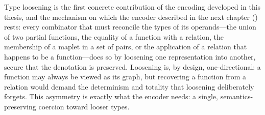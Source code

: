 Type loosening is the first concrete contribution of the encoding developed in this thesis, and the mechanism on which the \beer encoder described in the next chapter () rests: every combinator that must reconcile the types of its operands---the union of two partial functions, the equality of a function with a relation, the membership of a maplet in a set of pairs, or the application of a relation that happens to be a function---does so by loosening one representation into another, secure that the denotation is preserved. Loosening is, by design, one-directional: a function may always be viewed as its graph, but recovering a function from a relation would demand the determinism and totality that loosening deliberately forgets. This asymmetry is exactly what the encoder needs: a single, semantics-preserving coercion toward looser types.
